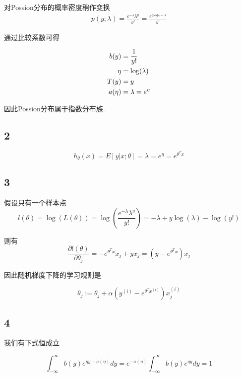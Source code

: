 \documentclass{ctexart}
\begin{document}
对Possion分布的概率密度稍作变换
\begin{align}
	p(y;\lambda) = \frac{e^{-\lambda}\lambda^y}{y!} = \frac{e^{ylog\lambda-\lambda}}{y!}
\end{align}

通过比较系数可得

\begin{align}
	b(y) &= \frac{1}{y!} \notag \\
	\eta &= \log(\lambda) \notag \\
	T(y) &= y \notag \\
	a(\eta) &= \lambda = e^{\eta}  \notag
\end{align}

因此Possion分布属于指数分布族.

\subsection{2} 
\begin{equation*}
	h_\theta(x) = E[y|x;\theta] = \lambda = e^\eta = e^{\theta^T x}
\end{equation*}

\subsection{3}

假设只有一个样本点
\begin{equation}
	l(\theta) = \log(L(\theta)) = \log(\frac{e^{-\lambda}\lambda^y}{y!}) = -\lambda + y \log(\lambda) - \log(y!)
\end{equation}

则有
\begin{equation}
	\frac{\partial l(\theta)}{\partial \theta_j} = -e^{\theta^Tx}x_j + yx_j = (y - e^{\theta^Tx})x_j
\end{equation}

因此随机梯度下降的学习规则是

\begin{equation}
	\theta_j:= \theta_j + \alpha(y^{(i)} - e^{\theta^Tx^{(i)}})x_j^{(i)}
\end{equation}

\subsection{4}
我们有下式恒成立

\begin{equation}
	\int_{-\infty}^{\infty} b(y)e^{\eta y - a(\eta)}dy =e^{-a(\eta)} \int_{-\infty}^{\infty} b(y)e^{\eta y}dy =1
\end{equation}
\end{document}
